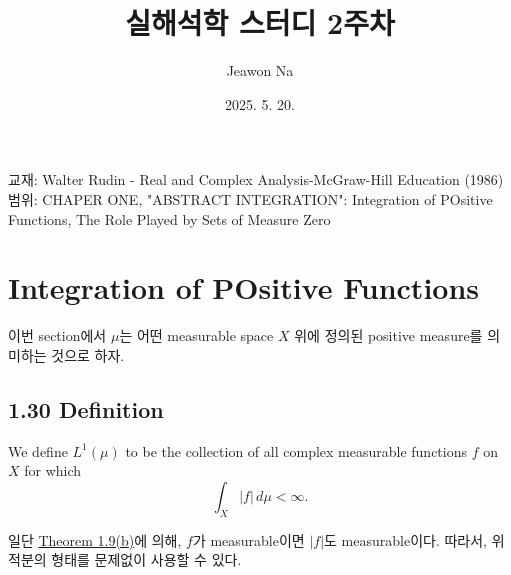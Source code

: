 \documentclass[11pt,reqno]{amsart}
\renewcommand{\(}{\left(}
\renewcommand{\)}{\right)}
\renewcommand{\[}{\left[}
\renewcommand{\]}{\right]}
\newenvironment{textbox}
  {\begin{tcolorbox}[
    colback=gray!10, 
    colframe=gray!50, 
    boxrule=0.5pt,
    fontupper=\normalfont
  ]}
  {\end{tcolorbox}}
\begin{document}
\title[]{실해석학 스터디 2주차}
\author{Jeawon Na}
\date{2025. 5. 20.}

\maketitle

\vspace{0.5em}

교재: Walter Rudin - Real and Complex Analysis-McGraw-Hill Education (1986) \\
범위: CHAPER ONE, "ABSTRACT INTEGRATION": Integration of POsitive Functions, The Role Played by Sets of Measure Zero

\section{Integration of POsitive Functions}

이번 section에서 $\mu$는 어떤 measurable space $X$ 위에 정의된 positive measure를 의미하는 것으로 하자.

\subsection{1.30 Definition}

\begin{textbox}
  We define $L^1(\mu)$ to be the collection of all complex measurable functions $f$ on $X$ for which 
  \begin{equation*}
    \int_X |f| \, d \mu < \infty .
  \end{equation*}
\end{textbox} 

일단 \href{https://google.com}{Theorem 1.9(b)}에 의해, $f$가 measurable이면 $|f|$도 measurable이다. 따라서, 위 
적분의 형태를 문제없이 사용할 수 있다.
\end{document}
